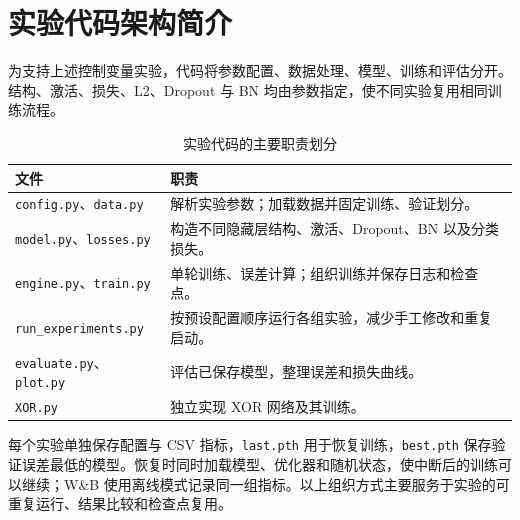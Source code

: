 \documentclass[UTF8,11pt,a4paper,fontset=fandol]{ctexart}
\begin{document}
\section{实验代码架构简介}
为支持上述控制变量实验，代码将参数配置、数据处理、模型、训练和评估分开。结构、激活、损失、L2、Dropout 与 BN 均由参数指定，使不同实验复用相同训练流程。
\begin{table}[H]\centering\small
\caption{实验代码的主要职责划分}
\begin{tabular}{p{5.7cm}p{9.8cm}}\toprule
文件 & 职责 \\\midrule
\texttt{config.py}、\texttt{data.py} & 解析实验参数；加载数据并固定训练、验证划分。 \\
\texttt{model.py}、\texttt{losses.py} & 构造不同隐藏层结构、激活、Dropout、BN 以及分类损失。 \\
\texttt{engine.py}、\texttt{train.py} & 单轮训练、误差计算；组织训练并保存日志和检查点。 \\
\texttt{run\_experiments.py} & 按预设配置顺序运行各组实验，减少手工修改和重复启动。 \\
\texttt{evaluate.py}、\texttt{plot.py} & 评估已保存模型，整理误差和损失曲线。 \\
\texttt{XOR.py} & 独立实现 XOR 网络及其训练。 \\
\bottomrule\end{tabular}
\end{table}
每个实验单独保存配置与 CSV 指标，\texttt{last.pth} 用于恢复训练，\texttt{best.pth} 保存验证误差最低的模型。恢复时同时加载模型、优化器和随机状态，使中断后的训练可以继续；W\&B 使用离线模式记录同一组指标。以上组织方式主要服务于实验的可重复运行、结果比较和检查点复用。
\end{document}
